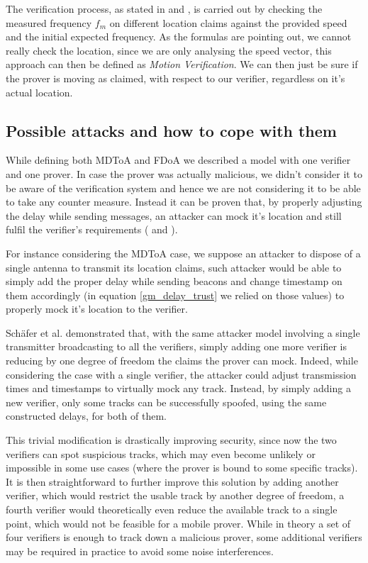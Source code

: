 The verification process, as stated in \cite{schaefer16} and \cite{ghose15}, is carried out by checking the measured frequency \(f_m\) on different location claims against the provided speed and the initial expected frequency. As the formulas are pointing out, we cannot really check the location, since we are only analysing the speed vector, this approach can then be defined as \textit{Motion Verification}. We can then just be sure if the prover is moving as claimed, with respect to our verifier, regardless on it's actual location.

\subsection{Possible attacks and how to cope with them} \label{gm_sec_attacks}

While defining both MDToA and FDoA we described a model with one verifier and one prover. In case the prover was actually malicious, we didn't consider it to be aware of the verification system and hence we are not considering it to be able to take any counter measure. Instead it can be proven that, by properly adjusting the delay while sending messages, an attacker can mock it's location and still fulfil the verifier's requirements (\cite{schaefer15} and \cite{schaefer16}).

For instance considering the MDToA case, we suppose an attacker to dispose of a single antenna to transmit its location claims, such attacker would be able to simply add the proper delay while sending beacons and change timestamp on them accordingly (in equation \eqref{gm_delay_trust} we relied on those values) to properly mock it's location to the verifier.

Schäfer et al. \cite{schaefer15} demonstrated that, with the same attacker model involving a single transmitter broadcasting to all the verifiers, simply adding one more verifier is reducing by one degree of freedom the claims the prover can mock. Indeed, while considering the case with a single verifier, the attacker could adjust transmission times and timestamps to virtually mock any track. Instead, by simply adding a new verifier, only some tracks can be successfully spoofed, using the same constructed delays, for both of them.

This trivial modification is drastically improving security, since now the two verifiers can spot suspicious tracks, which may even become unlikely or impossible in some use cases (where the prover is bound to some specific tracks). It is then straightforward to further improve this solution by adding another verifier, which would restrict the usable track by another degree of freedom, a fourth verifier would theoretically even reduce the available track to a single point, which would not be feasible for a mobile prover.
While in theory a set of four verifiers is enough to track down a malicious prover, some additional verifiers may be required in practice to avoid some noise interferences.

